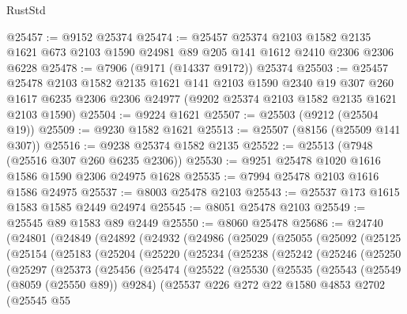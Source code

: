 \begin{lexlean}{RustStd}
\begin{coremodule}
@25457 := @9152 @25374
@25474 := @25457
    @25374
    @2103
    @1582
    @2135
    @1621
    @673
    @2103
    @1590
    @24981
    @89
    @205
    @141
    @1612
    @2410
    @2306
    @2306
    @6228
@25478 := @7906 (@9171 (@14337 @9172)) @25374
@25503 := @25457
    @25478
    @2103
    @1582
    @2135
    @1621
    @141
    @2103
    @1590
    @2340
    @19
    @307
    @260
    @1617
    @6235
    @2306
    @2306
    @24977
    (@9202 @25374 @2103 @1582 @2135 @1621 @2103 @1590)
@25504 := @9224 @1621
@25507 := @25503 (@9212 (@25504 @19))
@25509 := @9230 @1582 @1621
@25513 := @25507 (@8156 (@25509 @141 @307))
@25516 := @9238 @25374 @1582 @2135
@25522 := @25513 (@7948 (@25516 @307 @260 @6235 @2306))
@25530 := @9251 @25478 @1020 @1616 @1586 @1590 @2306 @24975 @1628
@25535 := @7994 @25478 @2103 @1616 @1586 @24975
@25537 := @8003 @25478 @2103
@25543 := @25537 @173 @1615 @1583 @1585 @2449 @24974
@25545 := @8051 @25478 @2103
@25549 := @25545 @89 @1583 @89 @2449
@25550 := @8060 @25478
@25686 := @24740
    (@24801
      (@24849
        (@24892
          (@24932
            (@24986
              (@25029
                (@25055
                  (@25092
                    (@25125
                      (@25154
                        (@25183
                          (@25204
                            (@25220
                              (@25234
                                (@25238
                                  (@25242
                                    (@25246
                                      (@25250
                                        (@25297
                                          (@25373
                                            (@25456
                                              (@25474
                                                (@25522
                                                  (@25530
                                                    (@25535
                                                      (@25543
                                                        (@25549 (@8059 (@25550 @89)) @9284)
                                                        (@25537
                                                          @226
                                                          @272
                                                          @22
                                                          @1580
                                                          @4853
                                                          @2702
                                                          (@25545
                                                            @55

\end{coremodule}
\end{lexlean}
